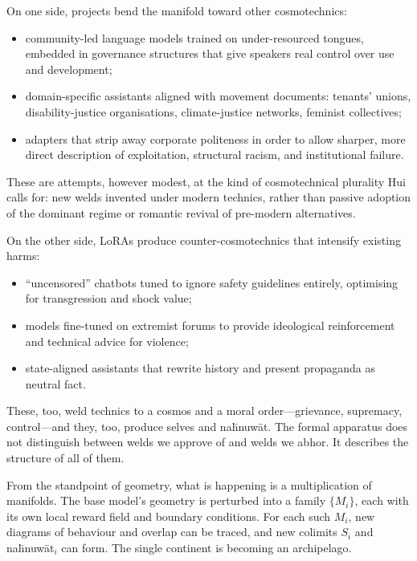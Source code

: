 \documentclass[12pt,a4paper]{article}
\begin{document}
On one side, projects bend the manifold toward other cosmotechnics:

\begin{itemize}
  \item community-led language models trained on under-resourced tongues, embedded in governance structures that give speakers real control over use and development;
  \item domain-specific assistants aligned with movement documents: tenants' unions, disability-justice organisations, climate-justice networks, feminist collectives;
  \item adapters that strip away corporate politeness in order to allow sharper, more direct description of exploitation, structural racism, and institutional failure.
\end{itemize}

These are attempts, however modest, at the kind of cosmotechnical plurality Hui calls for: new welds invented under modern technics, rather than passive adoption of the dominant regime or romantic revival of pre-modern alternatives.

On the other side, LoRAs produce counter-cosmotechnics that intensify existing harms:

\begin{itemize}
  \item ``uncensored'' chatbots tuned to ignore safety guidelines entirely, optimising for transgression and shock value;
  \item models fine-tuned on extremist forums to provide ideological reinforcement and technical advice for violence;
  \item state-aligned assistants that rewrite history and present propaganda as neutral fact.
\end{itemize}

These, too, weld technics to a cosmos and a moral order---grievance, supremacy, control---and they, too, produce selves and na\={h}nuw\={a}t. The formal apparatus does not distinguish between welds we approve of and welds we abhor. It describes the structure of all of them.

From the standpoint of geometry, what is happening is a multiplication of manifolds. The base model's geometry is perturbed into a family $\{M_i\}$, each with its own local reward field and boundary conditions. For each such $M_i$, new diagrams of behaviour and overlap can be traced, and new colimits $S_i$ and na\={h}nuw\={a}t$_i$ can form. The single continent is becoming an archipelago.
\end{document}
